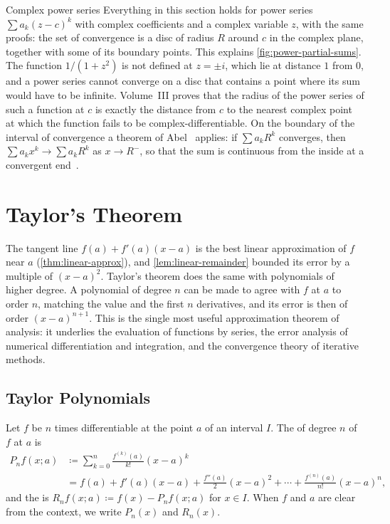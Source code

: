\begin{note}{Complex power series}
Everything in this section holds for power series $\sum a_k(z-c)^k$ with complex coefficients and a complex variable $z$, with the same proofs: the set of convergence is a disc of radius $R$ around $c$ in the complex plane, together with some of its boundary points. This explains \cref{fig:power-partial-sums}. The function $1/(1+z^2)$ is not defined at $z=\pm i$, which lie at distance $1$ from $0$, and a power series cannot converge on a disc that contains a point where its sum would have to be infinite. Volume~III proves that the radius of the power series of such a function at $c$ is exactly the distance from $c$ to the nearest complex point at which the function fails to be complex-differentiable. On the boundary of the interval of convergence a theorem of Abel~\cite{abel1826} applies: if $\sum a_kR^k$ converges, then $\sum a_kx^k\to\sum a_kR^k$ as $x\to R^-$, so that the sum is continuous from the inside at a convergent end~\cite{knopp1990}.
\end{note}

\section{Taylor's Theorem}
\label{sec:taylor}

The tangent line $f(a)+f'(a)(x-a)$ is the best linear approximation of $f$ near $a$ (\cref{thm:linear-approx}), and \cref{lem:linear-remainder} bounded its error by a multiple of $(x-a)^2$. Taylor's theorem does the same with polynomials of higher degree. A polynomial of degree $n$ can be made to agree with $f$ at $a$ to order $n$, matching the value and the first $n$ derivatives, and its error is then of order $(x-a)^{n+1}$. This is the single most useful approximation theorem of analysis: it underlies the evaluation of functions by series, the error analysis of numerical differentiation and integration, and the convergence theory of iterative methods.

\subsection{Taylor Polynomials}

\begin{definition}
\label{def:taylor-polynomial}
Let $f$ be $n$ times differentiable at the point $a$ of an interval $I$. The  of degree $n$ of $f$ at $a$ is
\begin{align*}
P_nf(x;a)&\coloneqq\sum_{k=0}^n\frac{f^{(k)}(a)}{k!}(x-a)^k\\
&=f(a)+f'(a)(x-a)+\frac{f''(a)}2(x-a)^2+\cdots+\frac{f^{(n)}(a)}{n!}(x-a)^n,
\end{align*}
and the  is $R_nf(x;a)\coloneqq f(x)-P_nf(x;a)$ for $x\in I$. When $f$ and $a$ are clear from the context, we write $P_n(x)$ and $R_n(x)$.
\end{definition}


